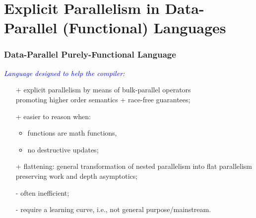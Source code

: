 \documentclass{beamer}
\newcommand{\blue}[1]{\textcolor{Blue}{{#1}}}
\newcommand{\emp}[1]{\textcolor{DikuRed}{ #1}}
\newcommand{\emphh}[1]{\textcolor{CosGreen}{ #1}}
\begin{document}
\section{Explicit Parallelism in Data-Parallel (Functional) Languages}

\begin{frame}[fragile]
	\tableofcontents[currentsection]
\end{frame}

\begin{frame}[fragile,t]
   \frametitle{Data-Parallel Purely-Functional Language}

\blue{\em Language designed to help the compiler:}\bigskip
\begin{itemize}
    \item[+] \emphh{explicit parallelism} by means of bulk-parallel operators\\ 
                promoting higher order semantics + race-free guarantees;\bigskip
    \item[+] easier to reason when:
        \begin{itemize}
            \item functions are math functions,
            \item no destructive updates;
        \end{itemize}\bigskip
    \item[+] \emphh{flattening}: general transformation of nested parallelism into
                flat parallelism preserving work and depth asymptotics;\bigskip
    \item[-] \emp{often inefficient;}\bigskip
    \item[-] \emp{require a learning curve}, i.e., not general purpose/mainstream.\bigskip
\end{itemize}

\end{frame}
\end{document}
